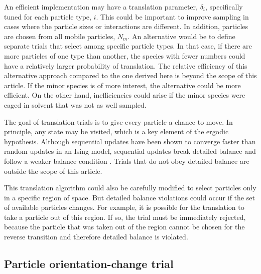 \documentclass[
  9pt,
  bestpractices,
]{livecoms}
\begin{document}
An efficient implementation may have a translation parameter, $\delta_i$, specifically tuned for each particle type, $i$.
This could be important to improve sampling in cases where the particle sizes or interactions are different.
In addition, particles are chosen from all mobile particles, $N_m$.
An alternative would be to define separate trials that select among specific particle types.
In that case, if there are more particles of one type than another, the species with fewer numbers could have a relatively larger probability of translation.
The relative efficiency of this alternative approach compared to the one derived here is beyond the scope of this article.
If the minor species is of more interest, the alternative could be more efficient.
On the other hand, inefficiencies could arise if the minor species were caged in solvent that was not as well sampled.

The goal of translation trials is to give every particle a chance to move.
In principle, any state may be visited, which is a key element of the ergodic hypothesis.
Although sequential updates have been shown to converge faster than random updates in an Ising model, sequential updates break detailed balance and follow a weaker balance condition \cite{ren_acceleration_2006}.
Trials that do not obey detailed balance are outside the scope of this article.

This translation algorithm could also be carefully modified to select particles only in a specific region of space.
But detailed balance violations could occur if the set of available particles changes.
For example, it is possible for the translation to take a particle out of this region.
If so, the trial must be immediately rejected, because the particle that was taken out of the region cannot be chosen for the reverse transition and therefore detailed balance is violated.

\subsection{\label{sec:lhs_rotation}Particle orientation-change trial}
\end{document}
